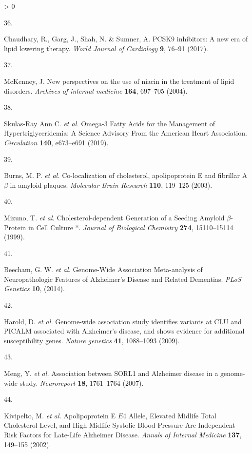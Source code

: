 \documentclass[a4paper, twoside]{templates/ociamthesis}
\newlength{\cslhangindent}
\newlength{\csllabelwidth}
\newenvironment{CSLReferences}[3] %
 {%
  \setlength{\parindent}{0pt}
  \ifodd #1 \everypar{\setlength{\hangindent}{\cslhangindent}}\ignorespaces\fi
  \ifnum #2 > 0
  \setlength{\parskip}{#2\baselineskip}
  \fi
 }%
 {}
\newcommand{\CSLLeftMargin}[1]{\parbox[t]{\maxof{\widthof{#1}}{\csllabelwidth}}{#1}}
\newcommand{\CSLRightInline}[1]{\parbox[t]{\linewidth - \csllabelwidth}{#1}}
\begin{document}
\begin{CSLReferences}{0}{0}
\leavevmode\hypertarget{ref-chaudhary2017}{}%
\CSLLeftMargin{36. }
\CSLRightInline{Chaudhary, R., Garg, J., Shah, N. \& Sumner, A. {PCSK9} inhibitors: {A} new era of lipid lowering therapy. \emph{World Journal of Cardiology} \textbf{9}, 76--91 (2017).}

\leavevmode\hypertarget{ref-mckenney2004new}{}%
\CSLLeftMargin{37. }
\CSLRightInline{McKenney, J. New perspectives on the use of niacin in the treatment of lipid disorders. \emph{Archives of internal medicine} \textbf{164}, 697--705 (2004).}

\leavevmode\hypertarget{ref-skulas-rayannc.2019}{}%
\CSLLeftMargin{38. }
\CSLRightInline{Skulas-Ray Ann C. \emph{et al.} Omega-3 {Fatty Acids} for the {Management} of {Hypertriglyceridemia}: {A Science Advisory From} the {American Heart Association}. \emph{Circulation} \textbf{140}, e673--e691 (2019).}

\leavevmode\hypertarget{ref-burns2003}{}%
\CSLLeftMargin{39. }
\CSLRightInline{Burns, M. P. \emph{et al.} Co-localization of cholesterol, apolipoprotein {E} and fibrillar {A\(\beta\)} in amyloid plaques. \emph{Molecular Brain Research} \textbf{110}, 119--125 (2003).}

\leavevmode\hypertarget{ref-mizuno1999}{}%
\CSLLeftMargin{40. }
\CSLRightInline{Mizuno, T. \emph{et al.} Cholesterol-dependent {Generation} of a {Seeding Amyloid} {\(\beta\)}-{Protein} in {Cell Culture} *. \emph{Journal of Biological Chemistry} \textbf{274}, 15110--15114 (1999).}

\leavevmode\hypertarget{ref-beecham2014}{}%
\CSLLeftMargin{41. }
\CSLRightInline{Beecham, G. W. \emph{et al.} Genome-{Wide Association Meta}-analysis of {Neuropathologic Features} of {Alzheimer}'s {Disease} and {Related Dementias}. \emph{PLoS Genetics} \textbf{10}, (2014).}

\leavevmode\hypertarget{ref-harold2009}{}%
\CSLLeftMargin{42. }
\CSLRightInline{Harold, D. \emph{et al.} Genome-wide association study identifies variants at {CLU} and {PICALM} associated with {Alzheimer}'s disease, and shows evidence for additional susceptibility genes. \emph{Nature genetics} \textbf{41}, 1088--1093 (2009).}

\leavevmode\hypertarget{ref-meng2007}{}%
\CSLLeftMargin{43. }
\CSLRightInline{Meng, Y. \emph{et al.} Association between {SORL1} and {Alzheimer} disease in a genome-wide study. \emph{Neuroreport} \textbf{18}, 1761--1764 (2007).}

\leavevmode\hypertarget{ref-kivipelto2002}{}%
\CSLLeftMargin{44. }
\CSLRightInline{Kivipelto, M. \emph{et al.} Apolipoprotein {E} {\(E\)}4 {Allele}, {Elevated Midlife Total Cholesterol Level}, and {High Midlife Systolic Blood Pressure Are Independent Risk Factors} for {Late}-{Life Alzheimer Disease}. \emph{Annals of Internal Medicine} \textbf{137}, 149--155 (2002).}


\end{CSLReferences}
\end{document}
